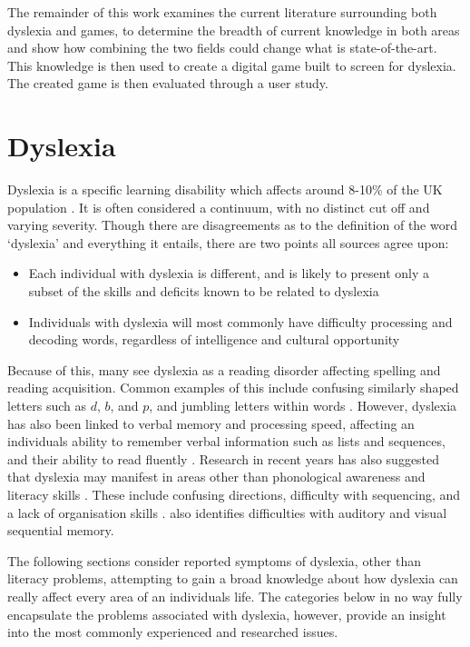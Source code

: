 \documentclass[journal]{IEEEtran}
\begin{document}
The remainder of this work examines the current literature surrounding both dyslexia and games, to determine the breadth of current knowledge in both areas and show how combining the two fields could change what is state-of-the-art. This knowledge is then used to create a digital game built to screen for dyslexia. The created game is then evaluated through a user study.

\section{Dyslexia}
\label{sec:dyslexia}

Dyslexia is a specific learning disability which affects around 8-10\% of the UK population \cite{Nhs,bda}. It is often considered a continuum, with no distinct cut off and varying severity. Though there are disagreements as to the definition of the word `dyslexia' and everything it entails, there are two points all sources agree upon:
 
\begin{itemize}
\item Each individual with dyslexia is different, and is likely to present only a
	subset of the skills and deficits known to be related to dyslexia 
\item Individuals with dyslexia will most commonly have difficulty processing
	and decoding words, regardless of intelligence and cultural opportunity
\end{itemize}

Because of this, many see dyslexia as a reading disorder affecting spelling and reading acquisition. Common examples of this include confusing similarly shaped letters such as $d$, $b$, and $p$, and jumbling letters within words \cite{DetectAndManage}. However, dyslexia has also been linked to verbal memory and processing speed, affecting an individuals ability to remember verbal information such as lists and sequences, and their ability to read fluently \cite{Nhs, RoseReview}. Research in recent years has also suggested that dyslexia may manifest in areas other than phonological awareness and literacy skills \cite{snowling, DetectAndManage}.  These include confusing directions, difficulty with sequencing, and a lack of organisation skills \cite{bda}. \cite{DetectAndManage} also identifies difficulties with auditory and visual sequential memory.

The following sections consider reported symptoms of dyslexia, other than literacy problems, attempting to gain a broad knowledge about how dyslexia can really affect every area of an individuals life. The categories below in no way fully encapsulate the problems associated with dyslexia, however, provide an insight into the most commonly experienced and researched issues.
\end{document}
